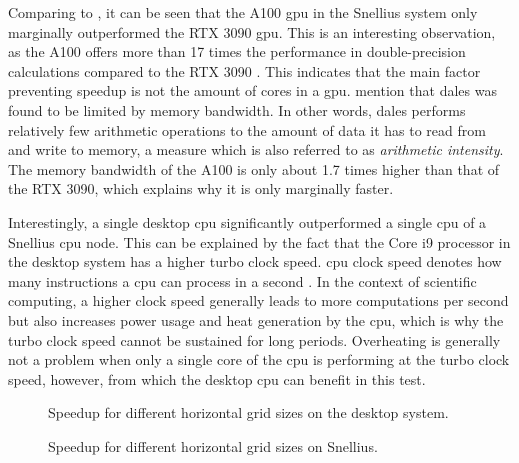 Comparing  to , it can be seen that the A100 \acrshort{gpu} in the Snellius system only marginally outperformed the RTX 3090 \acrshort{gpu}. This is an interesting observation, as the A100 offers more than 17 times the performance in double-precision calculations compared to the RTX 3090 \citep{nvidiaNVIDIAA100Tensor2020,nvidiaNVIDIAAmpereGA1022021}. This indicates that the main factor preventing speedup is not the amount of cores in a \acrshort{gpu}. \citet{janssonCloudBotanyShallow2023} mention that \acrshort{dales} was found to be limited by memory bandwidth. In other words, \acrshort{dales} performs relatively few arithmetic operations to the amount of data it has to read from and write to memory, a measure which is also referred to as \emph{arithmetic intensity}. The memory bandwidth of the A100 is only about 1.7 times higher than that of the RTX 3090, which explains why it is only marginally faster.

Interestingly, a single desktop \acrshort{cpu} significantly outperformed a single \acrshort{cpu} of a Snellius \acrshort{cpu} node. This can be explained by the fact that the Core i9 processor in the desktop system has a higher turbo clock speed. \acrshort{cpu} clock speed denotes how many instructions a \acrshort{cpu} can process in a second \citep{rauberParallelProgrammingMulticore2023}. In the context of scientific computing, a higher clock speed generally leads to more computations per second but also increases power usage and heat generation by the \acrshort{cpu}, which is why the turbo clock speed cannot be sustained for long periods. Overheating is generally not a problem when only a single core of the \acrshort{cpu} is performing at the turbo clock speed, however, from which the desktop \acrshort{cpu} can benefit in this test.

\begin{figure}[h!]
    \centering
    
    \caption{Speedup for different horizontal grid sizes on the desktop system.}
    \label{fig:speedup_desktop}
\end{figure}

\begin{figure}[h!]
    \centering
    
    \caption{Speedup for different horizontal grid sizes on Snellius.}
    \label{fig:speedup_snellius}
\end{figure}

\newpage

